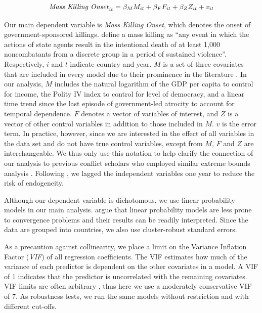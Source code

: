 \documentclass[a4paper,12pt]{article}
\begin{document}
\begin{equation}
\text{\textit{Mass Killing Onset}}_{it} = \beta_{M}M_{it} + \beta_{F}F_{it} + \beta_{Z}Z_{it} + v_{it}
\end{equation}
	
Our main dependent variable is \textit{Mass Killing Onset}, which denotes the onset of government-sponsored killings. \citet[2]{ulfelder2008assessing} define a mass killing as ``any event in which the actions of state agents result in the intentional death of at least 1,000 noncombatants from a discrete group in a period of sustained violence''. Respectively, $i$ and $t$ indicate country and year. $M$ is a set of three covariates that are included in every model due to their prominence in the literature \citep{levine1992vale}. In our analysis, $M$ includes the natural logarithm of the GDP per capita to control for income, the Polity IV index to control for level of democracy, and a linear time trend since the last episode of government-led atrocity to account for temporal dependence. $F$ denotes a vector of variables of interest, and $Z$ is a vector of other control variables in addition to those included in $M$. $v$ is the error term. In practice, however, since we are interested in the effect of all variables in the data set and do not have true control variables, except from $M$, $F$ and $Z$ are interchangeable. We thus only use this notation to help clarify the connection of our analysis to previous conflict scholars who employed similar extreme bounds analysis \citep[e.g.,][]{hegre2006sensitivity,gassebner2016expect}. Following \citet[514]{hegre2006sensitivity}, we lagged the independent variables one year to reduce the risk of endogeneity. 

Although our dependent variable is dichotomous, we use linear probability models in our main analysis. \citet[298]{gassebner2016expect} argue that linear probability models are less prone to convergence problems and their results can be readily interpreted. Since the data are grouped into countries, we also use cluster-robust standard errors.
	 
As a precaution against collinearity, we place a limit on the Variance Inflation Factor (\textit{VIF}) of all regression coefficients. The VIF estimates how much of the variance of each predictor is dependent on the other covariates in a model. A VIF of 1 indicates that the predictor is uncorrelated with the remaining covariates. VIF limits are often arbitrary \citep{bell2015examining,o2007caution}, thus here we use a moderately conservative VIF of 7. As robustness tests, we run the same models without restriction and with different cut-offs.
	
\end{document}
